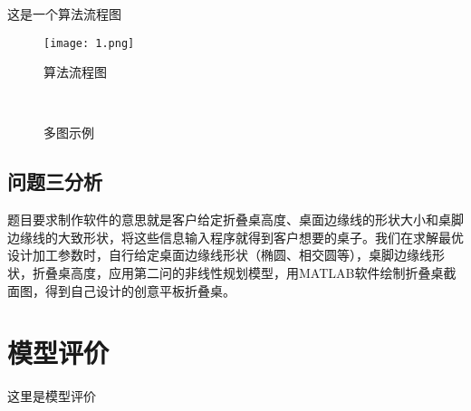 \documentclass[bwprint,12pt,fontset=windows]{gmcmthesis}
\begin{document}
这是一个算法流程图
\begin{figure}[htp!]
\centering
\texttt{[image: 1.png]}
\caption{算法流程图}
\end{figure}

\clearpage
\begin{figure}[!htp]
	\centering
	\qquad
	 \\
	\qquad
	\caption{多图示例}
\end{figure}


\subsection{问题三分析}


题目要求制作软件的意思就是客户给定折叠桌高度、桌面边缘线的形状大小和桌脚边缘线的大致形状，将这些信息输入程序就得到客户想要的桌子。我们在求解最优设计加工参数时，自行给定桌面边缘线形状（椭圆、相交圆等），桌脚边缘线形状，折叠桌高度，应用第二问的非线性规划模型，用MATLAB软件绘制折叠桌截面图，得到自己设计的创意平板折叠桌。


\section{模型评价}

这里是模型评价




\cite{mittelbach_latex_2004,wright_latex3_2009,beeton_unicode_2008,vieth_experiences_2009}



\end{document}
